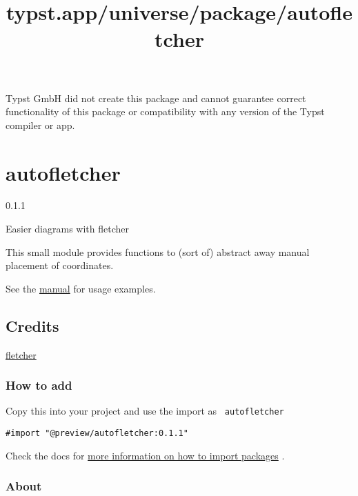 Typst GmbH did not create this package and cannot guarantee correct
functionality of this package or compatibility with any version of the
Typst compiler or app.


\title{typst.app/universe/package/autofletcher}

\label{banner}
\section{autofletcher}\label{autofletcher}

{ 0.1.1 }

Easier diagrams with fletcher

\label{readme}
This small module provides functions to (sort of) abstract away manual
placement of coordinates.

See the
\href{https://raw.githubusercontent.com/3akev/autofletcher/main/manual.pdf}{manual}
for usage examples.

\subsection{Credits}\label{credits}

\href{https://github.com/Jollywatt/typst-fletcher}{fletcher}

\subsubsection{How to add}\label{how-to-add}

Copy this into your project and use the import as
\texttt{\ autofletcher\ }

\begin{verbatim}
#import "@preview/autofletcher:0.1.1"
\end{verbatim}



Check the docs for
\href{https://typst.app/docs/reference/scripting/\#packages}{more
information on how to import packages} .

\subsubsection{About}\label{about}

